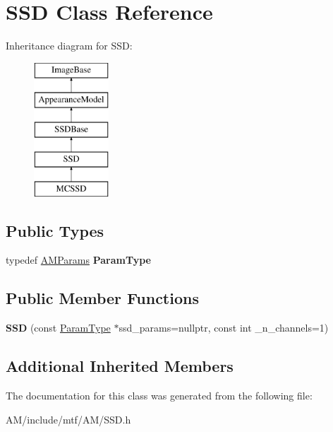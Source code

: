 \hypertarget{classSSD}{\section{S\-S\-D Class Reference}
\label{classSSD}
}
Inheritance diagram for S\-S\-D\-:\begin{figure}[H]
\begin{center}
\leavevmode
\includegraphics[height=5.000000cm]{classSSD}
\end{center}
\end{figure}
\subsection*{Public Types}
\begin{DoxyCompactItemize}
\item 
\hypertarget{classSSD_abd4788caaed629946171e0e89a7133fa}{typedef \hyperlink{structAMParams}{A\-M\-Params} {\bfseries Param\-Type}}\label{classSSD_abd4788caaed629946171e0e89a7133fa}

\end{DoxyCompactItemize}
\subsection*{Public Member Functions}
\begin{DoxyCompactItemize}
\item 
\hypertarget{classSSD_a07a7af77f6930e084e5403d5792cf82d}{{\bfseries S\-S\-D} (const \hyperlink{structAMParams}{Param\-Type} $\ast$ssd\-\_\-params=nullptr, const int \-\_\-n\-\_\-channels=1)}\label{classSSD_a07a7af77f6930e084e5403d5792cf82d}

\end{DoxyCompactItemize}
\subsection*{Additional Inherited Members}


The documentation for this class was generated from the following file\-:\begin{DoxyCompactItemize}
\item 
A\-M/include/mtf/\-A\-M/S\-S\-D.\-h\end{DoxyCompactItemize}
